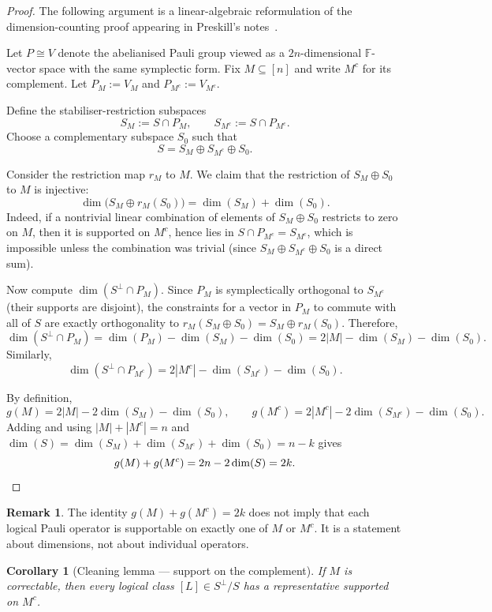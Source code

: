 \documentclass[11pt]{article}
\theoremstyle{plain}
\newtheorem{corollary}{Corollary}
\theoremstyle{definition}
\newtheorem{remark}{Remark}
\newcommand{\F}{\mathbb{F}}
\begin{document}
\begin{proof}
The following argument is a linear-algebraic reformulation of the dimension-counting proof
appearing in Preskill's notes~\cite{Preskill2022TopologicalStabilizerCodes}.

Let $P \cong V$ denote the abelianised Pauli group viewed as a $2n$-dimensional $\F$-vector
space with the same symplectic form.  Fix $M \subseteq [n]$ and write $M^c$ for its
complement.  Let $P_M := V_M$ and $P_{M^c} := V_{M^c}$.

Define the stabiliser-restriction subspaces
\[
  S_M := S \cap P_M, \qquad S_{M^c} := S \cap P_{M^c}.
\]
Choose a complementary subspace $S_0$ such that
\[
  S = S_M \oplus S_{M^c} \oplus S_0.
\]

Consider the restriction map $r_M$ to $M$.  We claim that the restriction of
$S_M \oplus S_0$ to $M$ is injective:
\[
  \dim\bigl( S_M \oplus r_M(S_0) \bigr) = \dim(S_M) + \dim(S_0).
\]
Indeed, if a nontrivial linear combination of elements of $S_M \oplus S_0$ restricts to zero
on $M$, then it is supported on $M^c$, hence lies in $S \cap P_{M^c} = S_{M^c}$, which is
impossible unless the combination was trivial (since $S_M \oplus S_{M^c} \oplus S_0$ is a
direct sum).

Now compute $\dim(S^\perp \cap P_M)$.  Since $P_M$ is symplectically orthogonal to $S_{M^c}$
(their supports are disjoint), the constraints for a vector in $P_M$ to commute with all of
$S$ are exactly orthogonality to $r_M(S_M \oplus S_0) = S_M \oplus r_M(S_0)$.  Therefore,
\[
  \dim(S^\perp \cap P_M) = \dim(P_M) - \dim(S_M) - \dim(S_0) = 2|M| - \dim(S_M) - \dim(S_0).
\]
Similarly,
\[
  \dim(S^\perp \cap P_{M^c}) = 2|M^c| - \dim(S_{M^c}) - \dim(S_0).
\]

By definition,
\[
  g(M) = 2|M| - 2\dim(S_M) - \dim(S_0),
  \qquad
  g(M^c) = 2|M^c| - 2\dim(S_{M^c}) - \dim(S_0).
\]
Adding and using $|M| + |M^c| = n$ and
$\dim(S) = \dim(S_M) + \dim(S_{M^c}) + \dim(S_0) = n - k$ gives
\[
  g(M) + g(M^c) = 2n - 2\dim(S) = 2k. \qedhere
\]
\end{proof}

\begin{remark}
The identity $g(M) + g(M^c) = 2k$ does not imply that each logical Pauli operator is
supportable on exactly one of $M$ or $M^c$.  It is a statement about dimensions, not about
individual operators.
\end{remark}

\begin{corollary}[Cleaning lemma --- support on the complement]\label{cor:cleaning}
If $M$ is correctable, then every logical class $[L] \in S^\perp / S$ has a representative
supported on $M^c$.
\end{corollary}
\end{document}
